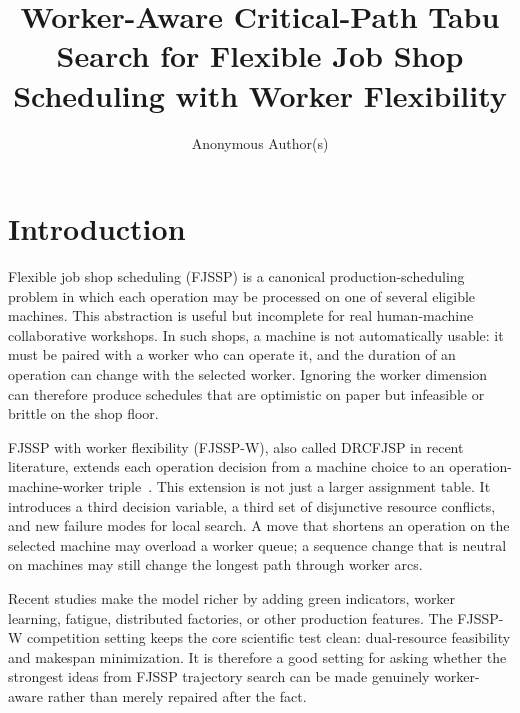 \documentclass[sigconf,anonymous,review,dvipsnames]{acmart}
\title{Worker-Aware Critical-Path Tabu Search for Flexible Job Shop Scheduling with Worker Flexibility}
\author{Anonymous Author(s)}
\affiliation{%
  \institution{Anonymous Institution}
  \city{Anonymous}
  \country{Anonymous}
}
\begin{document}
\maketitle

\section{Introduction}
Flexible job shop scheduling (FJSSP) is a canonical production-scheduling problem in which each operation may be processed on one of several eligible machines.
This abstraction is useful but incomplete for real human-machine collaborative workshops.
In such shops, a machine is not automatically usable: it must be paired with a worker who can operate it, and the duration of an operation can change with the selected worker.
Ignoring the worker dimension can therefore produce schedules that are optimistic on paper but infeasible or brittle on the shop floor.

FJSSP with worker flexibility (FJSSP-W), also called DRCFJSP in recent literature, extends each operation decision from a machine choice to an operation-machine-worker triple~\cite{gong2018workerflex,gong2020habc,li2025ceamcp,hutter2025benchmark}.
This extension is not just a larger assignment table.
It introduces a third decision variable, a third set of disjunctive resource conflicts, and new failure modes for local search.
A move that shortens an operation on the selected machine may overload a worker queue; a sequence change that is neutral on machines may still change the longest path through worker arcs.

Recent studies make the model richer by adding green indicators, worker learning, fatigue, distributed factories, or other production features.
The FJSSP-W competition setting keeps the core scientific test clean: dual-resource feasibility and makespan minimization.
It is therefore a good setting for asking whether the strongest ideas from FJSSP trajectory search can be made genuinely worker-aware rather than merely repaired after the fact.
\end{document}
